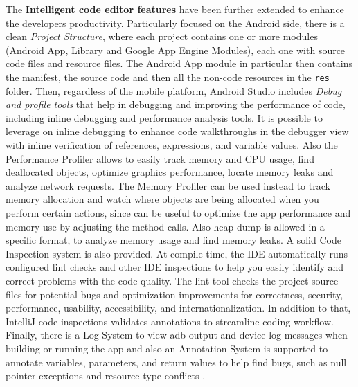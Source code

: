 \noindent The \textbf{Intelligent code editor features} have been further extended to enhance the developers productivity. Particularly focused on the Android side, there is a clean \textit{Project Structure}, where each project contains one or more modules (Android App, Library and Google App Engine Modules), each one with source code files and resource files. The Android App module in particular then contains the manifest, the source code and then all the non-code resources in the \texttt{res} folder. Then, regardless of the mobile platform, Android Studio includes \textit{Debug and profile tools} that help in debugging and improving the performance of code, including inline debugging and performance analysis tools. It is possible to leverage on inline debugging to enhance code walkthroughs in the debugger view with inline verification of references, expressions, and variable values. Also the Performance Profiler allows to easily track memory and CPU usage, find deallocated objects, optimize graphics performance, locate memory leaks and analyze network requests. The Memory Profiler can be used instead to track memory allocation and watch where objects are being allocated when you perform certain actions, since can be useful to optimize the app performance and memory use by adjusting the method calls. Also heap dump is allowed in a specific format, to analyze memory usage and find memory leaks. A solid Code Inspection system is also provided. At compile time, the IDE automatically runs configured lint checks and other IDE inspections to help you easily identify and correct problems with the code quality. The lint tool checks the project source files for potential bugs and optimization improvements for correctness, security, performance, usability, accessibility, and internationalization. In addition to that, IntelliJ code inspections validates annotations to streamline coding workflow. Finally, there is a Log System to view adb output and device log messages when building or running the app and also an Annotation System is supported to annotate variables, parameters, and return values to help find bugs, such as null pointer exceptions and resource type conflicts \cite{AndroidStudioCodeEditorFeature}.

